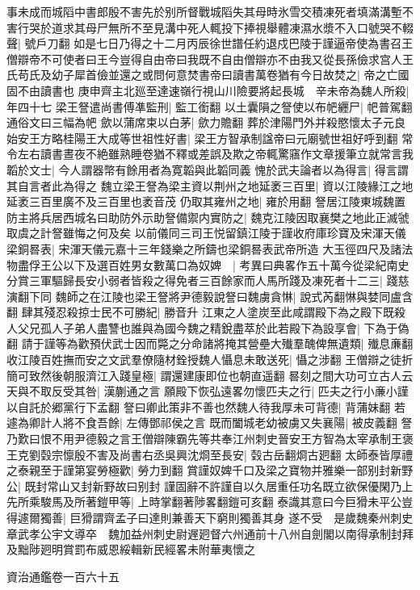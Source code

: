 事未成而城䧟中書郎殷不害先於别所督戰城䧟失其母時氷雪交積凍死者填滿溝塹不害行哭於道求其母尸無所不至見溝中死人輒投下捧視舉體凍濕水漿不入口號哭不輟聲|{
	號戶刀翻}
如是七日乃得之十二月丙辰徐世譜任約退戍巴陵于謹逼帝使為書召王僧辯帝不可使者曰王今豈得自由帝曰我既不自由僧辯亦不由我又從長孫儉求宫人王氏苟氏及幼子犀首儉並還之或問何意焚書帝曰讀書萬卷猶有今日故焚之|{
	帝之亡國固不由讀書也}
庚申齊主北廵至達速嶺行視山川險要將起長城　辛未帝為魏人所殺|{
	年四十七}
梁王詧遣尚書傅凖監刑|{
	監工銜翻}
以土囊隕之詧使以布帊纒尸|{
	帊普駕翻通俗文曰三幅為帊}
歛以蒲席束以白茅|{
	歛力贍翻}
葬於津陽門外并殺愍懷太子元良始安王方略桂陽王大成等世祖性好書|{
	梁王方智承制諡帝曰元廟號世祖好呼到翻}
常令左右讀書晝夜不絶雖熟睡卷猶不釋或差誤及欺之帝輒驚窹作文章援筆立就常言我韜於文士|{
	今人謂器幣有餘用者為寛韜與此韜同義}
愧於武夫論者以為得言|{
	得言謂其自言者此為得之}
魏立梁王詧為梁主資以荆州之地延袤三百里|{
	資以江陵緣江之地延袤三百里廣不及三百里也袤音茂}
仍取其雍州之地|{
	雍於用翻}
詧居江陵東城魏置防主將兵居西城名曰助防外示助詧備禦内實防之|{
	魏克江陵因取襄樊之地此正滅虢取虞之計詧雖悔之何及矣}
以前儀同三司王悦留鎮江陵于謹收府庫珍寶及宋渾天儀梁銅晷表|{
	宋渾天儀元嘉十三年錢樂之所鑄也梁銅晷表武帝所造}
大玉徑四尺及諸法物盡俘王公以下及選百姓男女數萬口為奴婢　|{
	考異曰典畧作五十萬今從梁紀南史}
分賞三軍驅歸長安小弱者皆殺之得免者三百餘家而人馬所踐及凍死者十二三|{
	踐慈演翻下同}
魏師之在江陵也梁王詧將尹德毅說詧曰魏虜貪惏|{
	說式芮翻惏與婪同盧含翻}
肆其殘忍殺掠士民不可勝紀|{
	勝音升}
江東之人塗炭至此咸謂殿下為之殿下既殺人父兄孤人子弟人盡讐也誰與為國今魏之精銳盡萃於此若殿下為設享會|{
	下為于偽翻}
請于謹等為歡預伏武士因而斃之分命諸將掩其營壘大殱羣醜俾無遺類|{
	殱息亷翻}
收江陵百姓撫而安之文武羣僚隨材銓授魏人懾息未敢送死|{
	懾之涉翻}
王僧辯之徒折簡可致然後朝服濟江入踐皇極|{
	謂還建康即位也朝直遥翻}
晷刻之間大功可立古人云天與不取反受其咎|{
	漢蒯通之言}
願殿下恢弘遠畧勿懷匹夫之行|{
	匹夫之行小亷小謹以自託於郷黨行下孟翻}
詧曰卿此策非不善也然魏人待我厚未可背德|{
	背蒲妹翻}
若遽為卿計人將不食吾餘|{
	左傳鄧祁侯之言}
既而闔城老幼被虜又失襄陽|{
	被皮義翻}
詧乃歎曰恨不用尹德毅之言王僧辯陳霸先等共奉江州刺史晉安王方智為太宰承制王褒王克劉㲄宗懔殷不害及尚書右丞吳興沈烱至長安|{
	㲄古岳翻烱古㢠翻}
太師泰皆厚禮之泰親至于謹第宴勞極歡|{
	勞力到翻}
賞謹奴婢千口及梁之寶物并雅樂一部别封新野公|{
	既封常山又封新野故曰别封}
謹固辭不許謹自以久居重任功名既立欲保優閑乃上先所乘駿馬及所著鎧甲等|{
	上時掌翻著陟畧翻鎧可亥翻}
泰識其意曰今巨猾未平公豈得遽爾獨善|{
	巨猾謂齊孟子曰達則兼善天下窮則獨善其身}
遂不受　是歲魏秦州刺史章武孝公宇文導卒　魏加益州刺史尉遟㢠督六州通前十八州自劍閣以南得承制封拜及黜陟㢠明賞罰布威恩綏輯新民經畧未附華夷懷之

資治通鑑卷一百六十五
